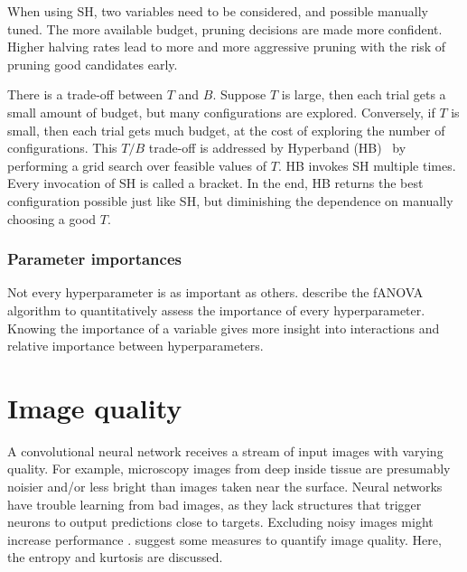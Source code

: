 When using SH, two variables need to be considered, and possible manually tuned.
The more available budget, pruning decisions are made more confident.
Higher halving rates lead to more and more aggressive pruning with the risk of pruning good candidates early.

There is a trade-off between $T$ and $B$.
Suppose $T$ is large, then each trial gets a small amount of budget, but many configurations are explored.
Conversely, if $T$ is small, then each trial gets much budget, at the cost of exploring the number of configurations.
This $T/B$ trade-off is addressed by Hyperband (HB)~ by performing a grid search over feasible values of $T$.
HB invokes SH multiple times.
Every invocation of SH is called a bracket.
In the end, HB returns the best configuration possible just like SH, but diminishing the dependence on manually choosing a good $T$.

\subsubsection{Parameter importances}
Not every hyperparameter is as important as others.
\citeauthor{Hutter2014}  describe the fANOVA algorithm to quantitatively assess the importance of every hyperparameter.
Knowing the importance of a variable gives more insight into interactions and relative importance between hyperparameters.



\section{Image quality}\label{subsec:imq}
A convolutional neural network receives a stream of input images with varying quality.
For example, microscopy images from deep inside tissue are presumably noisier and/or less bright than images taken near the surface.
Neural networks have trouble learning from bad images, as they lack structures that trigger neurons to output predictions close to targets.
Excluding noisy images might increase performance .
\citeauthor{Koho2016}  suggest some measures to quantify image quality.
Here, the entropy and kurtosis are discussed.

